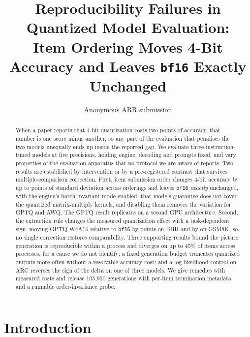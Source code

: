 \documentclass[11pt]{article}
\title{Reproducibility Failures in Quantized Model Evaluation:\\
Item Ordering Moves 4-Bit Accuracy and Leaves \texttt{bf16} Exactly Unchanged}
\author{Anonymous ARR submission}
\begin{document}
\maketitle

\begin{abstract}
When a paper reports that 4-bit quantization costs two points of accuracy, that number is
one score minus another, so any part of the evaluation that penalises the two models
unequally ends up inside the reported gap. We evaluate three instruction-tuned models at
five precisions, holding engine, decoding and prompts fixed, and vary properties of the
evaluation apparatus that no protocol we are aware of reports. Two results are established
by intervention or by a pre-registered contrast that survives multiple-comparison correction.
First, item submission order changes 4-bit accuracy by up to \hEightWorstSDTen{} points of
standard deviation across \hEightSDOrderings{} orderings and leaves \texttt{bf16}
\emph{exactly} unchanged, with the engine's batch-invariant mode enabled: that mode's
guarantee does not cover the quantized matrix-multiply kernels, and disabling them removes
the variation for GPTQ and AWQ. The GPTQ result replicates on a second GPU architecture. Second, the extraction rule changes the measured
quantization effect with a task-dependent sign, moving GPTQ W4A16 relative to
\texttt{bf16} by \hThreeBbhGptqFour{} points on BBH and by \hThreeGsmGptqFour{} on GSM8K,
so no single correction restores comparability. Three supporting results bound the
picture: generation is reproducible within a process and diverges on up to 45\% of items
across processes, for a cause we do not identify; a fixed generation budget truncates
quantized outputs more often without a resolvable accuracy cost; and a log-likelihood
control on ARC reverses the sign of the delta on one of three models. We give remedies
with measured costs and release 105{,}950 generations with per-item termination metadata
and a runnable order-invariance probe.
\end{abstract}

\section{Introduction}
\label{sec:intro}
\end{document}
